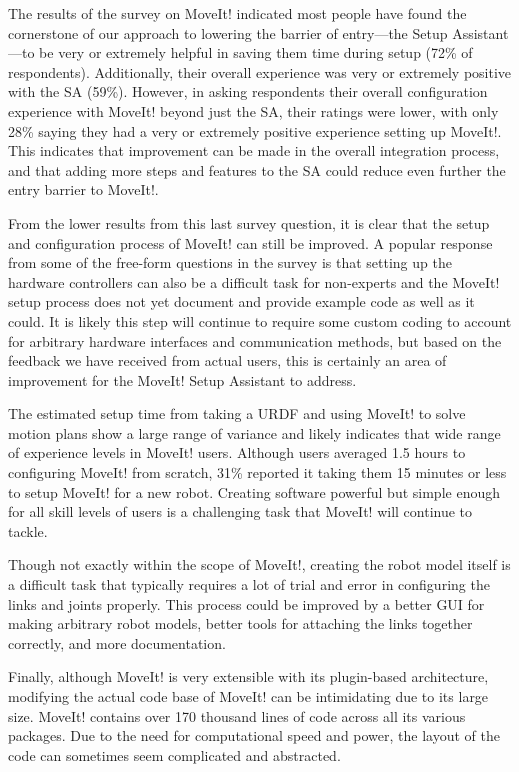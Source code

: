 \documentclass[10pt,journal,compsoc]{joser1}
\begin{document}
{The results of the survey on MoveIt! indicated most people have found the cornerstone of our approach to lowering the barrier of entry---the Setup Assistant---to be very or extremely helpful in saving them time during setup (72\% of respondents). Additionally, their overall experience was very or extremely positive with the SA (59\%). However, in asking respondents their overall configuration experience with MoveIt! beyond just the SA, their ratings were lower, with only 28\% saying they had a very or extremely positive experience setting up MoveIt!. This indicates that improvement can be made in the overall integration process, and that adding more steps and features to the SA could reduce even further the entry barrier to MoveIt!. 

From the lower results from this last survey question, it is clear that the setup and configuration process of MoveIt! can still be improved. A popular response from some of the free-form questions in the survey is that setting up the hardware controllers can also be a difficult task for non-experts and the MoveIt! setup process does not yet document and provide example code as well as it could. It is likely this step will continue to require some custom coding to account for arbitrary hardware interfaces and communication methods, but based on the feedback we have received from actual users, this is certainly an area of improvement for the MoveIt! Setup Assistant to address. 

The estimated setup time from taking a URDF and using MoveIt! to solve motion plans show a large range of variance and likely indicates that wide range of experience levels in MoveIt! users. Although users averaged 1.5 hours to configuring MoveIt! from scratch, 31\% reported it taking them 15 minutes or less to setup MoveIt! for a new robot. Creating software powerful but simple enough for all skill levels of users is a challenging task that MoveIt! will continue to tackle.

Though not exactly within the scope of MoveIt!, creating the robot model itself is a difficult task that typically requires a lot of trial and error in configuring the links and joints properly. This process could be improved by a better GUI for making arbitrary robot models, better tools for attaching the links together correctly, and more documentation.

Finally, although MoveIt! is very extensible with its plugin-based architecture, modifying the actual code base of MoveIt! can be intimidating due to its large size. MoveIt! contains over 170 thousand lines of code across all its various packages. Due to the need for computational speed and power, the layout of the code can sometimes seem complicated and abstracted. 

}
\end{document}
